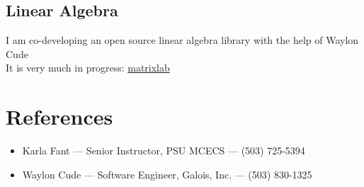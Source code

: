 \documentclass{article}
\begin{document}
\subsection{Linear Algebra}
I am co-developing an open source linear algebra library with the help
of Waylon Cude\\
It is very much in progress:
\href{https://www.gitlab.com/AustenN/matrixlab}{matrixlab}
\section{References}
\begin{itemize}
\item Karla Fant --- Senior Instructor, PSU MCECS --- (503) 725-5394
\item Waylon Cude --- Software Engineer, Galois, Inc. --- (503) 830-1325
\end{itemize}
\end{document}
